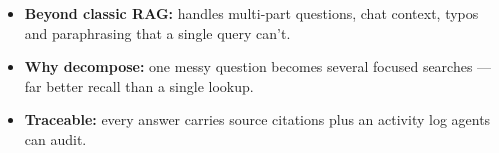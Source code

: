 \documentclass{beamer}
\begin{document}
\begin{frame}
\begin{center}
\end{center}

\vspace{-0.05cm}
{\footnotesize
\begin{itemize}
  \item \textbf{\color{earlblue}Beyond classic RAG:} handles multi-part questions, chat context, typos and paraphrasing that a single query can't.
  \item \textbf{\color{earlblue}Why decompose:} one messy question becomes several focused searches --- far better recall than a single lookup.
  \item \textbf{\color{earlblue}Traceable:} every answer carries source citations plus an activity log agents can audit.
\end{itemize}
}
\end{frame}

\end{document}
